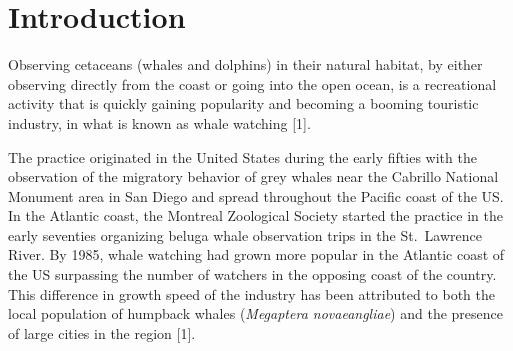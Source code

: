 \documentclass[10pt,letterpaper]{article}
\newcommand{\getIndex}[2]{
  \ForEach{,}{\IfEq{#1}{\thislevelitem}{\number\thislevelcount\ExitForEach}{}}{#2}
}
\newcommand{\getAff}[1]{
  \getIndex{#1}{Pontificia Universidad Católica de Chile}
}
\begin{document}
\vspace*{0.2in}



\linenumbers

\hypertarget{introduction}{%
\section{Introduction}\label{introduction}}

Observing cetaceans (whales and dolphins) in their natural habitat, by
either observing directly from the coast or going into the open ocean,
is a recreational activity that is quickly gaining popularity and
becoming a booming touristic industry, in what is known as whale
watching {[}1{]}.

The practice originated in the United States during the early fifties
with the observation of the migratory behavior of grey whales near the
Cabrillo National Monument area in San Diego and spread throughout the
Pacific coast of the US. In the Atlantic coast, the Montreal Zoological
Society started the practice in the early seventies organizing beluga
whale observation trips in the St.~Lawrence River. By 1985, whale
watching had grown more popular in the Atlantic coast of the US
surpassing the number of watchers in the opposing coast of the country.
This difference in growth speed of the industry has been attributed to
both the local population of humpback whales (\emph{Megaptera
novaeangliae}) and the presence of large cities in the region {[}1{]}.
\end{document}
